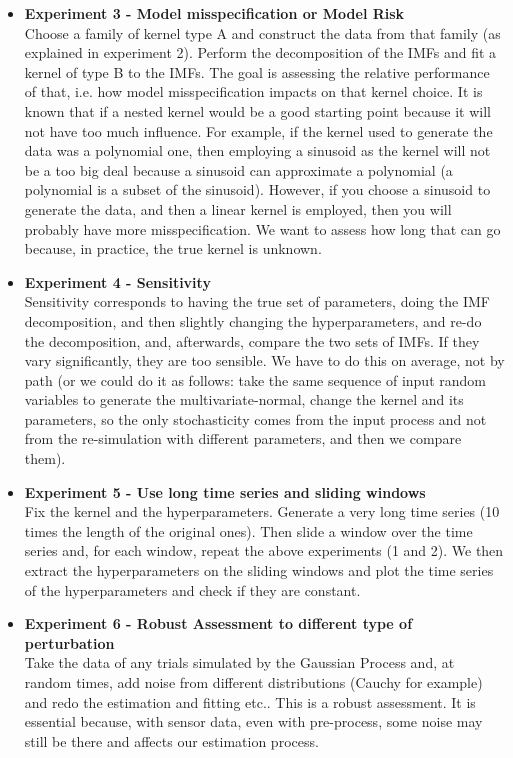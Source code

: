 \documentclass[11pt, a4paper]{article} %
\begin{document}
\begin{itemize}
\item \textbf{Experiment 3 - Model misspecification or Model Risk\\}
Choose a family of kernel type A and construct the data from that family (as explained in experiment 2). Perform the decomposition of the IMFs and fit a kernel of type B to the IMFs. The goal is assessing the relative performance of that, i.e. how model misspecification impacts on that kernel choice. It is known that if a nested kernel would be a good starting point because it will not have too much influence. For example, if the kernel used to generate the data was a polynomial one, then employing a sinusoid as the kernel will not be a too big deal because a sinusoid can approximate a polynomial (a polynomial is a subset of the sinusoid). However, if you choose a sinusoid to generate the data, and then a linear kernel is employed, then you will probably have more misspecification. We want to assess how long that can go because, in practice, the true kernel is unknown. 

\item \textbf{Experiment 4 - Sensitivity\\}
Sensitivity corresponds to having the true set of parameters, doing the IMF decomposition, and then slightly changing the hyperparameters, and re-do the decomposition, and, afterwards, compare the two sets of IMFs. If they vary significantly, they are too sensible. We have to do this on average, not by path (or we could do it as follows: take the same sequence of input random variables to generate the multivariate-normal, change the kernel and its parameters, so the only stochasticity comes from the input process and not from the re-simulation with different parameters, and then we compare them). 

\item \textbf{Experiment 5 - Use long time series and sliding windows}\\
Fix the kernel and the hyperparameters. Generate a very long time series (10 times the length of the original ones). Then slide a window over the time series and, for each window, repeat the above experiments (1 and 2). We then extract the hyperparameters on the sliding windows and plot the time series of the hyperparameters and check if they are constant.


\item \textbf{Experiment 6 - Robust Assessment to different type of perturbation}\\
Take the data of any trials simulated by the Gaussian Process and, at random times, add noise from different distributions (Cauchy for example) and redo the estimation and fitting etc.. This is a robust assessment. It is essential because, with sensor data, even with pre-process, some noise may still be there and affects our estimation process.  


\end{itemize}
\end{document}
